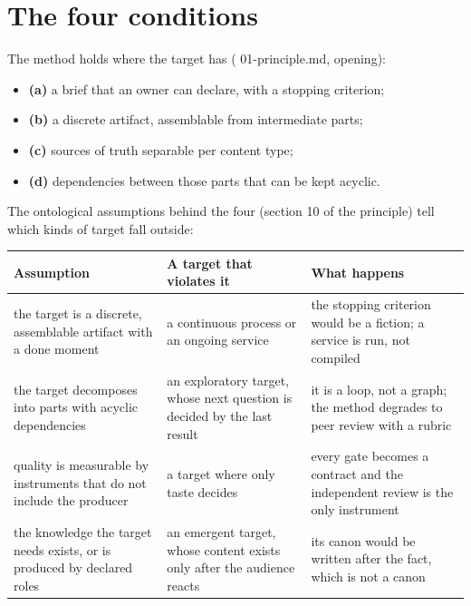 \documentclass[
  american,
  10pt,
]{report}
\newcounter{none} %
\providecommand{\tightlist}{%
  \setlength{\itemsep}{0pt}\setlength{\parskip}{0pt}}
\renewcommand{\texttt}[1]{{\ttfamily\hyphenchar\font=-1 #1}}
\begin{document}
\section{The four conditions}\label{the-four-conditions}

The method holds where the target has
(\texttt{01-\allowbreak{}principle.\allowbreak{}md}, opening):

\begin{itemize}
\tightlist
\item
  \textbf{(a)} a brief that an owner can declare, with a stopping
  criterion;
\item
  \textbf{(b)} a discrete artifact, assemblable from intermediate parts;
\item
  \textbf{(c)} sources of truth separable per content type;
\item
  \textbf{(d)} dependencies between those parts that can be kept
  acyclic.
\end{itemize}

The ontological assumptions behind the four (section 10 of the
principle) tell which kinds of target fall outside:

{\def\LTcaptype{none} %
\begin{longtable}[]{@{}
  >{\raggedright\arraybackslash}p{}
  >{\raggedright\arraybackslash}p{}
  >{\raggedright\arraybackslash}p{}@{}}
\toprule\noalign{}
\begin{minipage}[b]{\linewidth}\raggedright
Assumption
\end{minipage} & \begin{minipage}[b]{\linewidth}\raggedright
A target that violates it
\end{minipage} & \begin{minipage}[b]{\linewidth}\raggedright
What happens
\end{minipage} \\
\midrule\noalign{}
\endhead
\bottomrule\noalign{}
\endlastfoot
the target is a discrete, assemblable artifact with a done moment & a
continuous process or an ongoing service & the stopping criterion would
be a fiction; a service is run, not compiled \\
the target decomposes into parts with acyclic dependencies & an
exploratory target, whose next question is decided by the last result &
it is a loop, not a graph; the method degrades to peer review with a
rubric \\
quality is measurable by instruments that do not include the producer &
a target where only taste decides & every gate becomes a contract and
the independent review is the only instrument \\
the knowledge the target needs exists, or is produced by declared roles
& an emergent target, whose content exists only after the audience
reacts & its canon would be written after the fact, which is not a
canon \\
\end{longtable}
}
\end{document}
